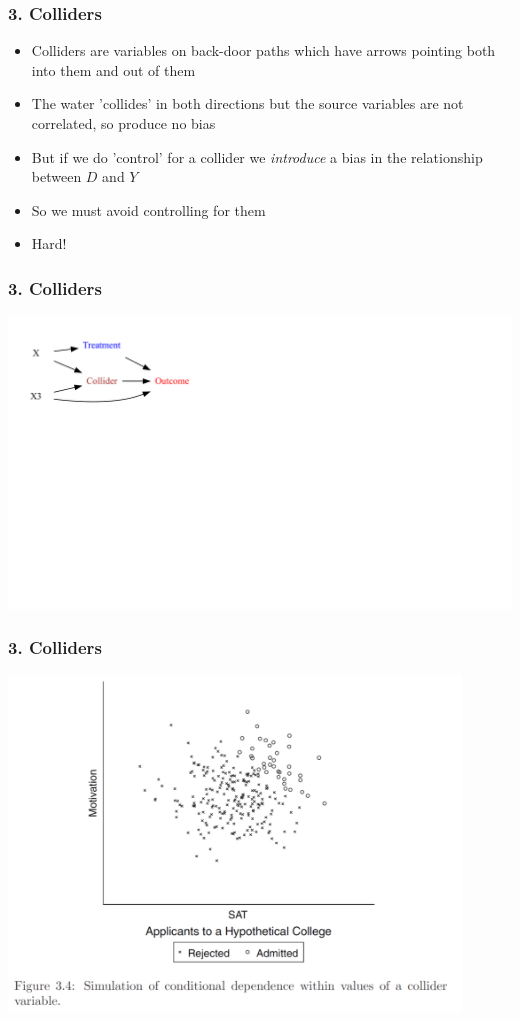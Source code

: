 \documentclass[xcolor=x11names,compress]{beamer}\usepackage[]{graphicx}\usepackage[]{color}
\newenvironment{knitrout}{}{} %
\renewcommand{\(}{\begin{columns}}
\renewcommand{\)}{\end{columns}}
\newcommand{\<}[1]{\begin{column}{#1}}
\renewcommand{\>}{\end{column}}
\begin{document}
\begin{frame}
\frametitle{3. Colliders}
\begin{itemize}
\item Colliders are variables on back-door paths which have arrows pointing both into them and out of them
\pause
\item The water 'collides' in both directions but the source variables are not correlated, so produce no bias
\pause
\item But if we do 'control' for a collider we \textit{introduce} a bias in the relationship between $D$ and $Y$
\pause
\item So we must avoid controlling for them
\pause
\item Hard!
\end{itemize}
\end{frame}

\begin{frame}
\frametitle{3. Colliders}
\begin{knitrout}
\color{fgcolor}
\includegraphics[width=2.7\linewidth]{figure/Dag5-1} 

\end{knitrout}
\end{frame}

\begin{frame}
\frametitle{3. Colliders}
\includegraphics[width=0.9\textwidth]{Collider.png}
\end{frame}
\end{document}
